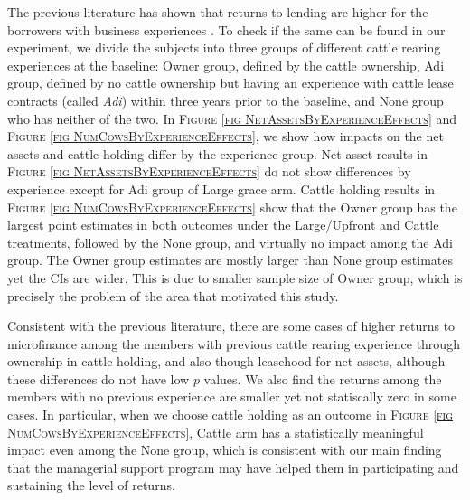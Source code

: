 	The previous literature has shown that returns to lending are higher for the borrowers with business experiences \citep{BanerjeeKarlanZinman2015}. To check if the same can be found in our experiment, we divide the subjects into three groups of different cattle rearing experiences at the baseline: \textsf{Owner} group, defined by the cattle ownership, \textsf{Adi} group, defined by no cattle ownership but having an experience with cattle lease contracts (called \textit{Adi}) within three years prior to the baseline, and \textsf{None} group who has neither of the two. In \textsc{\footnotesize Figure \ref{fig NetAssetsByExperienceEffects}} and \textsc{\footnotesize Figure \ref{fig NumCowsByExperienceEffects}}, we show how impacts on the net assets and cattle holding differ by the experience group. Net asset results in \textsc{\footnotesize Figure \ref{fig NetAssetsByExperienceEffects}} do not show differences by experience except for \textsf{Adi} group of \textsf{Large grace} arm. Cattle holding results in \textsc{\footnotesize Figure \ref{fig NumCowsByExperienceEffects}} show that the \textsf{Owner} group has the largest point estimates in both outcomes under the \textsf{Large/Upfront} and \textsf{Cattle} treatments, followed by the \textsf{None} group, and virtually no impact among the \textsf{Adi} group. The \textsf{Owner} group estimates are mostly larger than \textsf{None} group estimates yet the CIs are wider. This is due to smaller sample size of \textsf{Owner} group, which is precisely the problem of the area that motivated this study.

	Consistent with the previous literature, there are some cases of higher returns to microfinance among the members with previous cattle rearing experience through ownership in cattle holding, and also though leasehood for net assets, although these differences do not have low $p$ values. We also find the returns among the members with no previous experience are smaller yet not statiscally zero in some cases. In particular, when we choose cattle holding as an outcome in \textsc{\footnotesize Figure \ref{fig NumCowsByExperienceEffects}}, \textsf{Cattle} arm has a statistically meaningful impact even among the \textsf{None} group, which is consistent with our main finding that the managerial support program may have helped them in participating and sustaining the level of returns. 


